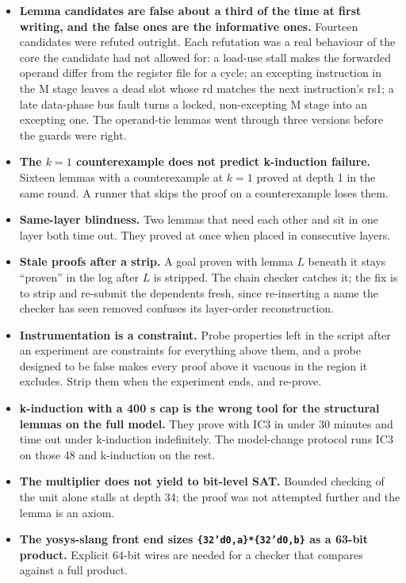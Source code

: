 \documentclass[11pt]{article}
\newcommand{\code}[1]{\texttt{#1}}
\begin{document}
\begin{itemize}
\item \textbf{Lemma candidates are false about a third of the time at first
  writing, and the false ones are the informative ones.} Fourteen candidates
  were refuted outright. Each refutation was a real behaviour of the core the
  candidate had not allowed for: a load-use stall makes the forwarded operand
  differ from the register file for a cycle; an excepting instruction in the
  M stage leaves a dead slot whose rd matches the next instruction's rs1; a
  late data-phase bus fault turns a locked, non-excepting M stage into an
  excepting one. The operand-tie lemmas went through three versions before the
  guards were right.
\item \textbf{The $k=1$ counterexample does not predict k-induction failure.}
  Sixteen lemmas with a counterexample at $k=1$ proved at depth 1 in the same
  round. A runner that skips the proof on a counterexample loses them.
\item \textbf{Same-layer blindness.} Two lemmas that need each other and sit in
  one layer both time out. They proved at once when placed in consecutive
  layers.
\item \textbf{Stale proofs after a strip.} A goal proven with lemma $L$ beneath
  it stays ``proven'' in the log after $L$ is stripped. The chain checker
  catches it; the fix is to strip and re-submit the dependents fresh, since
  re-inserting a name the checker has seen removed confuses its layer-order
  reconstruction.
\item \textbf{Instrumentation is a constraint.} Probe properties left in the
  script after an experiment are constraints for everything above them, and a
  probe designed to be false makes every proof above it vacuous in the region
  it excludes. Strip them when the experiment ends, and re-prove.
\item \textbf{k-induction with a 400 s cap is the wrong tool for the
  structural lemmas on the full model.} They prove with IC3 in under 30
  minutes and time out under k-induction indefinitely. The model-change
  protocol runs IC3 on those 48 and k-induction on the rest.
\item \textbf{The multiplier does not yield to bit-level SAT.} Bounded checking
  of the unit alone stalls at depth 34; the proof was not attempted further
  and the lemma is an axiom.
\item \textbf{The yosys-slang front end sizes \code{\{32'd0,a\}*\{32'd0,b\}} as
  a 63-bit product.} Explicit 64-bit wires are needed for a checker that
  compares against a full product.
\end{itemize}
\end{document}
